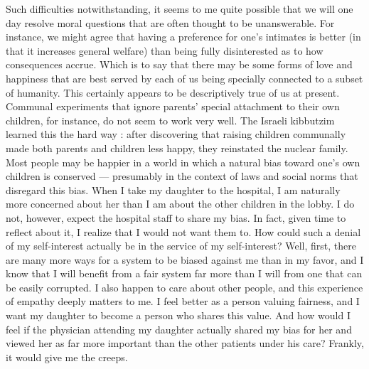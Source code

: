 \documentclass[a4paper,14pt]{extbook}
\begin{document}
Such difficulties notwithstanding, it seems to me quite possible that we will one day resolve moral questions that are often thought to be unanswerable.
For instance, we might agree that having a preference for one's intimates is better (in that it increases general welfare) than being fully disinterested as to how consequences accrue.
Which is to say that there may be some forms of love and happiness that are best served by each of us being specially connected to a subset of humanity.
This certainly appears to be descriptively true of us at present.
Communal experiments that ignore parents' special attachment to their own children, for instance, do not seem to work very well.
The Israeli kibbutzim learned this the hard way :
after discovering that raising children communally made both parents and children less happy, they reinstated the nuclear family.
Most people may be happier in a world in which a natural bias toward one's own children is conserved --- presumably in the context of laws and social norms that disregard this bias.
When I take my daughter to the hospital, I am naturally more concerned about her than I am about the other children in the lobby.
I do not, however, expect the hospital staff to share my bias.
In fact, given time to reflect about it, I realize that I would not want them to.
How could such a denial of my self-interest actually be in the service of my self-interest?
Well, first, there are many more ways for a system to be biased against me than in my favor, and I know that I will benefit from a fair system far more than I will from one that can be easily corrupted.
I also happen to care about other people, and this experience of empathy deeply matters to me.
I feel better as a person valuing fairness, and I want my daughter to become a person who shares this value.
And how would I feel if the physician attending my daughter actually shared my bias for her and viewed her as far more important than the other patients under his care?
Frankly, it would give me the creeps.
\end{document}
